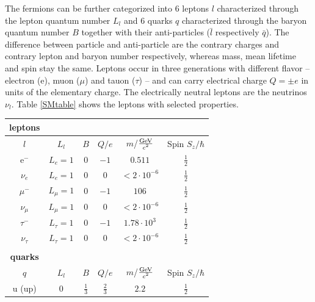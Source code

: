 The fermions can be further categorized into $6$ leptons $l$ characterized through the lepton quantum number $L_l$ and $6$ quarks $q$ characterized through the baryon quantum number $B$ together with their anti-particles ($\bar{l}$ respectively $\bar{q}$). The difference between particle and anti-particle are the contrary charges and contrary lepton and baryon number respectively, whereas mass, mean lifetime and spin stay the same. Leptons occur in three generations with different flavor -- electron (e), muon ($\mu$) and tauon ($\tau$) -- and can carry electrical charge $Q=\pm e$ in units of the elementary charge. The electrically neutral leptons are the neutrinos $\nu_l$. \cite{Griffiths}\newline
Table \ref{SMtable} shows the leptons with selected properties.\newline
\begin{table}[htbp]
		\centering
		\begin{tabular*}{\linewidth}{@{\extracolsep{\fill}}cccccc}
		\hline
		\hline
		\rule[-6pt]{0pt}{21pt}\textbf{leptons}  & & & &
		\\
		\hline
		\rule[-7pt]{0pt}{23pt} $l$ & $L_l$ & $B$ & $Q/e$ & $m$/$\frac{\SI{}{\giga\electronvolt}}{\SI{}{\text{\ensuremath{c}\squared}}}$ & Spin $S_z/\hbar$
		\\
		\hline
		\rule[-6pt]{0pt}{21pt} e$^-$ & \(L_e=1\) & $0$ & $-1$ & $0.511$ & $\frac{1}{2}$
		\\
		\rule[-6pt]{0pt}{21pt}$\nu_e$&  \(L_e=1\)	& $0$ & $0$ & $<2\cdot10^{-6}$ & $\frac{1}{2}$
		\\
		\rule[-6pt]{0pt}{21pt} $\mu^-$ & \(L_{\mu}=1\) & $0$ & $-1$ & $106$ & $\frac{1}{2}$
		\\
		\rule[-6pt]{0pt}{21pt}$\nu_{\mu}$ &  \(L_{\mu}=1\)	& $0$ & $0$ & $<2\cdot10^{-6}$ & $\frac{1}{2}$
		\\
		\rule[-6pt]{0pt}{21pt} $\tau^-$ & \(L_{\tau}=1\) & $0$ & $-1$ & $1.78\cdot10^3$ & $\frac{1}{2}$
		\\
		\rule[-6pt]{0pt}{21pt}$\nu_{\tau}$&  \(L_{\tau}=1\)	& $0$ & $0$ & $<2\cdot10^{-6}$ & $\frac{1}{2}$
		\\
		\rule[-6pt]{0pt}{21pt}  & & & &
		\\
		\rule[-6pt]{0pt}{21pt}\textbf{quarks}  & & & &
		\\
		\hline
		\rule[-7pt]{0pt}{23pt} $q$ & \(L_l\) & $B$ & $Q/e$ & $m$/$\frac{\SI{}{\giga\electronvolt}}{\SI{}{\text{\ensuremath{c}\squared}}}$ & Spin $S_z/\hbar$
		\\
		\hline
		\rule[-6pt]{0pt}{21pt} u (up) &  $0$	& $\frac{1}{3}$ & $\frac{2}{3}$ & $2.2$ & $\frac{1}{2}$

\end{tabular*}
\end{table}
